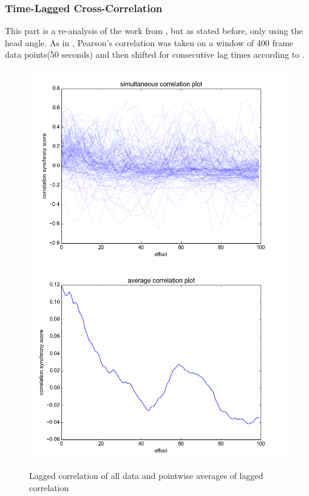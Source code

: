 \documentclass[12pt]{article}
\begin{document}
\subsubsection{Time-Lagged Cross-Correlation}

This part is a re-analysis of the work from \cite{andrea}, but as stated before, only using the head angle. As in \cite{andrea}, Pearson's correlation was taken on a window of 400 frame data points(50 seconds) and then shifted for consecutive lag times according to \cite{framedifferencing}.

\begin{figure}\label{fig:lag_correlation}
  \begin{center}
    \includegraphics[scale=0.6]{correlation_mc}
    \includegraphics[scale=0.6]{correlation_summary}
  \end{center}
  \caption{Lagged correlation of all data and pointwise averages of lagged correlation}
\end{figure}
\end{document}
